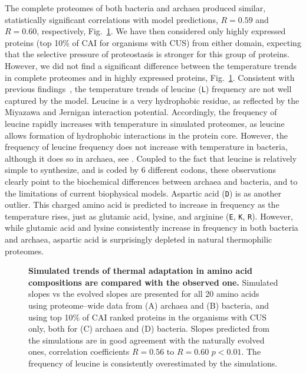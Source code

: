 \documentclass[10pt,letterpaper]{article}
\begin{document}
The complete proteomes of both bacteria and archaea produced similar, statistically significant correlations with model predictions, $R=0.59$ and $R=0.60$, respectively, Fig.~\ref{fig:fig5}. We have then considered only highly expressed proteins (top 10\% of CAI for organisms with CUS) from either domain, expecting that the selective pressure of proteostasis is stronger for this group of proteins. However, we did not find a significant difference between the temperature trends in complete proteomes and in highly expressed proteins, Fig.~\ref{fig:fig5}.  Consistent with previous findings~\cite{Venev2015Massively}, the temperature trends of leucine (\texttt{L}) frequency are not well captured by the model. Leucine is a very hydrophobic residue, as reflected by the Miyazawa and Jernigan interaction potential. Accordingly, the frequency of leucine rapidly increases with temperature in simulated proteomes, as leucine allows formation of hydrophobic interactions in the protein core. However, the frequency of leucine frequency does not increase with temperature in bacteria, although it does so in archaea, see . Coupled to the fact that leucine is relatively simple to synthesize, and is coded by 6 different codons, these observations clearly point to the biochemical differences between archaea and bacteria, and to the limitations of current biophysical models. Aspartic acid (\texttt{D}) is as another outlier. This charged amino acid is predicted to increase in frequency as the temperature rises, just as glutamic acid, lysine, and arginine (\texttt{E}, \texttt{K}, \texttt{R}). However, while glutamic acid and lysine consistently increase in frequency in both bacteria and archaea, aspartic acid is surprisingly depleted in natural thermophilic proteomes.

\begin{figure}[h!]
\caption{
{\bf Simulated trends of thermal adaptation in amino acid compositions are compared with the observed one.} Simulated slopes vs the evolved slopes are presented for all 20 amino acids using proteome--wide data from (A) archaea and (B) bacteria, and using top 10\% of CAI ranked proteins in the organisms with CUS only, both for (C) archaea and (D) bacteria. Slopes predicted from the simulations are in good agreement with the naturally evolved ones, correlation coefficients $R=0.56$ to $R=0.60$ $p<0.01$. The frequency of leucine is consistently overestimated by the simulations.
}
\label{fig:fig5}
\end{figure}
\end{document}
